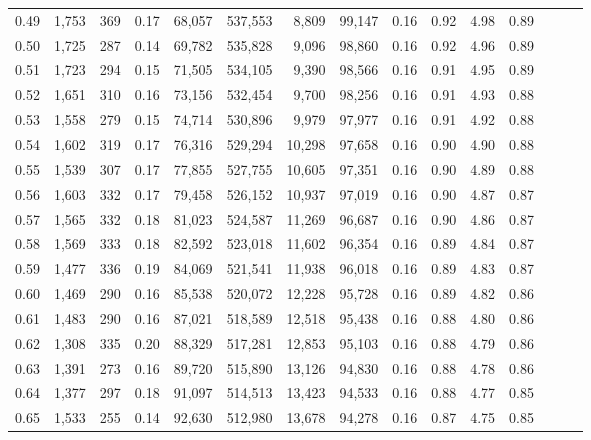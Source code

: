 \begin{tabular}{rrrrrrrrrrrrrrr}
0.49 &   1,753 &     369 &  0.17 &   68,057 &  537,553 &    8,809 &   99,147 &  0.16 &  0.92 &  4.98 &      0.89 \\
0.50 &   1,725 &     287 &  0.14 &   69,782 &  535,828 &    9,096 &   98,860 &  0.16 &  0.92 &  4.96 &      0.89 \\
0.51 &   1,723 &     294 &  0.15 &   71,505 &  534,105 &    9,390 &   98,566 &  0.16 &  0.91 &  4.95 &      0.89 \\
0.52 &   1,651 &     310 &  0.16 &   73,156 &  532,454 &    9,700 &   98,256 &  0.16 &  0.91 &  4.93 &      0.88 \\
0.53 &   1,558 &     279 &  0.15 &   74,714 &  530,896 &    9,979 &   97,977 &  0.16 &  0.91 &  4.92 &      0.88 \\
0.54 &   1,602 &     319 &  0.17 &   76,316 &  529,294 &   10,298 &   97,658 &  0.16 &  0.90 &  4.90 &      0.88 \\
0.55 &   1,539 &     307 &  0.17 &   77,855 &  527,755 &   10,605 &   97,351 &  0.16 &  0.90 &  4.89 &      0.88 \\
0.56 &   1,603 &     332 &  0.17 &   79,458 &  526,152 &   10,937 &   97,019 &  0.16 &  0.90 &  4.87 &      0.87 \\
0.57 &   1,565 &     332 &  0.18 &   81,023 &  524,587 &   11,269 &   96,687 &  0.16 &  0.90 &  4.86 &      0.87 \\
0.58 &   1,569 &     333 &  0.18 &   82,592 &  523,018 &   11,602 &   96,354 &  0.16 &  0.89 &  4.84 &      0.87 \\
0.59 &   1,477 &     336 &  0.19 &   84,069 &  521,541 &   11,938 &   96,018 &  0.16 &  0.89 &  4.83 &      0.87 \\
0.60 &   1,469 &     290 &  0.16 &   85,538 &  520,072 &   12,228 &   95,728 &  0.16 &  0.89 &  4.82 &      0.86 \\
0.61 &   1,483 &     290 &  0.16 &   87,021 &  518,589 &   12,518 &   95,438 &  0.16 &  0.88 &  4.80 &      0.86 \\
0.62 &   1,308 &     335 &  0.20 &   88,329 &  517,281 &   12,853 &   95,103 &  0.16 &  0.88 &  4.79 &      0.86 \\
0.63 &   1,391 &     273 &  0.16 &   89,720 &  515,890 &   13,126 &   94,830 &  0.16 &  0.88 &  4.78 &      0.86 \\
0.64 &   1,377 &     297 &  0.18 &   91,097 &  514,513 &   13,423 &   94,533 &  0.16 &  0.88 &  4.77 &      0.85 \\
0.65 &   1,533 &     255 &  0.14 &   92,630 &  512,980 &   13,678 &   94,278 &  0.16 &  0.87 &  4.75 &      0.85 \\

\end{tabular}
